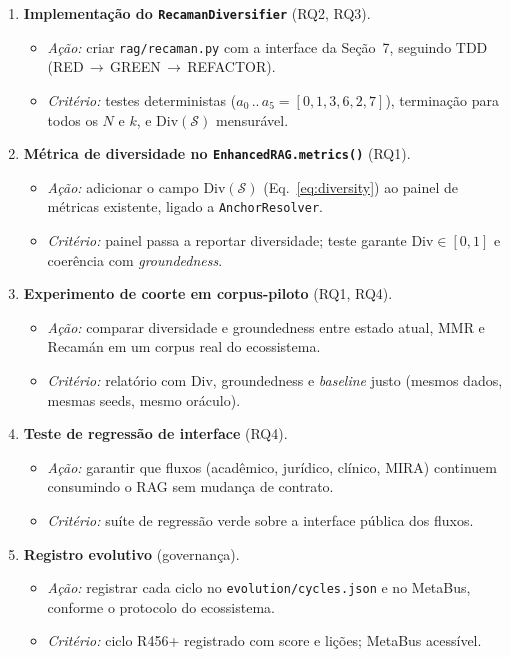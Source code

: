 \begin{enumerate}[label=\textbf{Fase \arabic*.}]
  \item \textbf{Implementação do \texttt{RecamanDiversifier}} (RQ2, RQ3).
        \begin{itemize}
          \item \emph{Ação:} criar \texttt{rag/recaman.py} com a interface da
                Seção~7, seguindo TDD (RED$\,\to\,$GREEN$\,\to\,$REFACTOR).
          \item \emph{Critério:} testes deterministas
                ($a_0\,..\,a_5 = [0,1,3,6,2,7]$), terminação para todos os
                $N$ e $k$, e $\text{Div}(\mathcal{S})$ mensurável.
        \end{itemize}
  \item \textbf{Métrica de diversidade no \texttt{EnhancedRAG.metrics()}} (RQ1).
        \begin{itemize}
          \item \emph{Ação:} adicionar o campo $\text{Div}(\mathcal{S})$
                (Eq.~\ref{eq:diversity}) ao painel de métricas existente, ligado a
                \texttt{AnchorResolver}.
          \item \emph{Critério:} painel passa a reportar diversidade; teste
                garante $\text{Div}\in[0,1]$ e coerência com \emph{groundedness}.
        \end{itemize}
  \item \textbf{Experimento de coorte em corpus-piloto} (RQ1, RQ4).
        \begin{itemize}
          \item \emph{Ação:} comparar diversidade e groundedness entre estado
                atual, MMR e Recamán em um corpus real do ecossistema.
          \item \emph{Critério:} relatório com $\text{Div}$, groundedness e
                \emph{baseline} justo (mesmos dados, mesmas seeds, mesmo oráculo).
        \end{itemize}
  \item \textbf{Teste de regressão de interface} (RQ4).
        \begin{itemize}
          \item \emph{Ação:} garantir que fluxos (acadêmico, jurídico, clínico,
                MIRA) continuem consumindo o RAG sem mudança de contrato.
          \item \emph{Critério:} suíte de regressão verde sobre a interface pública
                dos fluxos.
        \end{itemize}
  \item \textbf{Registro evolutivo} (governança).
        \begin{itemize}
          \item \emph{Ação:} registrar cada ciclo no \texttt{evolution/cycles.json}
                e no MetaBus, conforme o protocolo do ecossistema.
          \item \emph{Critério:} ciclo R456+ registrado com score e lições;
                MetaBus acessível.
        \end{itemize}
\end{enumerate}

